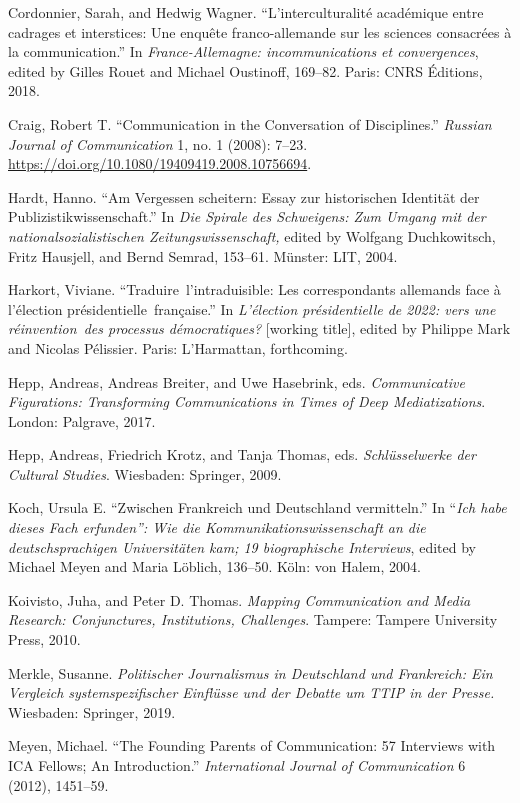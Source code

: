\documentclass{tufte-handout}
\begin{document}
\begin{hangparas}{.25in}{1}
Cordonnier, Sarah, and Hedwig Wagner. ``L'interculturalité académique
entre cadrages et interstices: Une enquête franco-allemande sur les
sciences consacrées à la communication.'' In \emph{France-Allemagne:
incommunications et convergences}, edited by Gilles Rouet and Michael
Oustinoff, 169--82. Paris: CNRS Éditions, 2018.

Craig, Robert T. ``Communication in the Conversation of Disciplines.''
\emph{Russian Journal of Communication} 1, no. 1 (2008): 7--23.
\url{https://doi.org/10.1080/19409419.2008.10756694}.

Hardt, Hanno. ``Am Vergessen scheitern: Essay zur historischen Identität
der Publizistikwissenschaft.'' In \emph{Die Spirale des Schweigens: Zum
Umgang mit der nationalsozialistischen Zeitungswissenschaft,} edited by
Wolfgang Duchkowitsch, Fritz Hausjell, and Bernd Semrad, 153--61.
Münster: LIT, 2004.

Harkort, Viviane. ``Traduire~l'intraduisible: Les correspondants
allemands face à l'élection présidentielle~française.'' In
\emph{L'élection présidentielle de 2022: vers une réinvention~des
processus démocratiques?} {[}working title{]}, edited by Philippe Mark
and Nicolas Pélissier. Paris: L'Harmattan, forthcoming.

Hepp, Andreas, Andreas Breiter, and Uwe Hasebrink, eds.
\emph{Communicative Figurations: Transforming Communications in Times of
Deep Mediatizations}. London: Palgrave, 2017.

Hepp, Andreas, Friedrich Krotz, and Tanja Thomas, eds.
\emph{Schlüsselwerke der Cultural Studies}. Wiesbaden: Springer, 2009.

Koch, Ursula E. ``Zwischen Frankreich und Deutschland vermitteln.'' In
``\emph{Ich habe dieses Fach erfunden'': Wie die
Kommunikationswissenschaft an die deutschsprachigen Universitäten kam;
19 biographische Interviews}, edited by Michael Meyen and Maria Löblich,
136--50. Köln: von Halem, 2004.

Koivisto, Juha, and Peter D. Thomas. \emph{Mapping Communication and
Media Research: Conjunctures, Institutions, Challenges}. Tampere:
Tampere University Press, 2010.

Merkle, Susanne. \emph{Politischer Journalismus in Deutschland und
Frankreich: Ein Vergleich systemspezifischer Einflüsse und der Debatte
um TTIP in der Presse.} Wiesbaden: Springer, 2019.

Meyen, Michael. ``The Founding Parents of Communication: 57 Interviews
with ICA Fellows; An Introduction.'' \emph{International Journal of
Communication} 6 (2012), 1451--59.


\end{hangparas}
\end{document}
